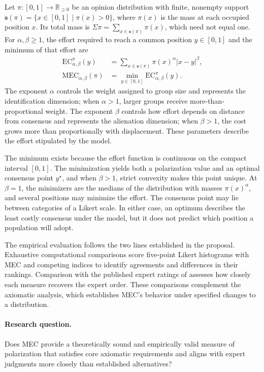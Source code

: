 \documentclass{article}
\theoremstyle{plain}
\theoremstyle{remark}
\begin{document}
Let $\pi\colon[0,1]\to\mathbb{R}_{\geq0}$ be an opinion distribution with finite, nonempty support $\boldsymbol{s}(\pi)=\{x\in[0,1]\mid\pi(x)>0\}$, where $\pi(x)$ is the mass at each occupied position $x$. Its total mass is $\Sigma\pi=\sum_{x\in\boldsymbol{s}(\pi)}\pi(x)$, which need not equal one. For $\alpha,\beta\geq1$, the effort required to reach a common position $y\in[0,1]$ and the minimum of that effort are
\begin{equation}\label{eq:MEC}
\begin{aligned}
\mathrm{EC}_{\alpha,\beta}^{\pi}(y)
  &= \sum_{x\in\boldsymbol{s}(\pi)} \pi(x)^{\alpha}\lvert x-y\rvert^{\beta},\\
\mathrm{MEC}_{\alpha,\beta}(\pi)
  &= \min_{y\in[0,1]} \mathrm{EC}_{\alpha,\beta}^{\pi}(y).
\end{aligned}
\end{equation}
The exponent $\alpha$ controls the weight assigned to group size and represents the identification dimension; when $\alpha>1$, larger groups receive more-than-proportional weight. The exponent $\beta$ controls how effort depends on distance from consensus and represents the alienation dimension; when $\beta>1$, the cost grows more than proportionally with displacement. These parameters describe the effort stipulated by the model.

The minimum exists because the effort function is continuous on the compact interval $[0,1]$. The minimization yields both a polarization value and an optimal consensus point $y^\star$, and when $\beta>1$, strict convexity makes this point unique. At $\beta=1$, the minimizers are the medians of the distribution with masses $\pi(x)^\alpha$, and several positions may minimize the effort. The consensus point may lie between categories of a Likert scale. In either case, an optimum describes the least costly consensus under the model, but it does not predict which position a population will adopt.

The empirical evaluation follows the two lines established in the proposal. Exhaustive computational comparisons score five-point Likert histograms with MEC and competing indices to identify agreements and differences in their rankings. Comparison with the published expert ratings of \citet{koudenburg2021new} assesses how closely each measure recovers the expert order. These comparisons complement the axiomatic analysis, which establishes MEC's behavior under specified changes to a distribution.

\paragraph{Research question.}
Does MEC provide a theoretically sound and empirically valid measure of polarization that satisfies core axiomatic requirements and aligns with expert judgments more closely than established alternatives?
\end{document}
